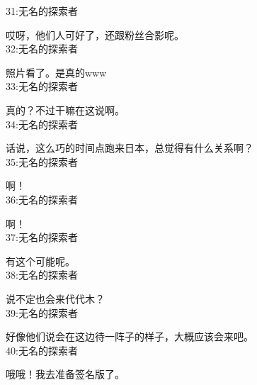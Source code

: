 31:无名的探索者

哎呀，他们人可好了，还跟粉丝合影呢。\\

32:无名的探索者

照片看了。是真的www\\

33:无名的探索者

真的？不过干嘛在这说啊。\\

34:无名的探索者

话说，这么巧的时间点跑来日本，总觉得有什么关系啊？\\

35:无名的探索者

啊！\\

36:无名的探索者

啊！\\

37:无名的探索者

有这个可能呢。\\

38:无名的探索者

说不定也会来代代木？\\

39:无名的探索者

好像他们说会在这边待一阵子的样子，大概应该会来吧。\\

40:无名的探索者

哦哦！我去准备签名版了。\\
